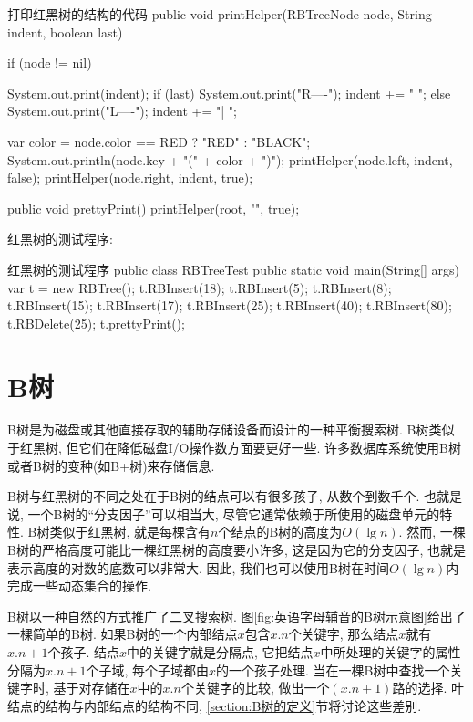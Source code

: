 \documentclass[oneside,10pt,fontset=none]{ctexbook}
\numberwithin{definition}{chapter}
\numberwithin{theorem}{chapter}
\numberwithin{lemma}{chapter}
\begin{document}
\begin{myjava}{}{打印红黑树的结构的代码}{}
public void printHelper(RBTreeNode node, String indent, boolean last) {
    if (node != nil) {
        System.out.print(indent);
        if (last) {
            System.out.print("R----");
            indent += "    ";
        } else {
            System.out.print("L----");
            indent += "|    ";
        }

        var color = node.color == RED ? "RED" : "BLACK";
        System.out.println(node.key + "(" + color + ")");
        printHelper(node.left, indent, false);
        printHelper(node.right, indent, true);
    }
}

public void prettyPrint() {
    printHelper(root, "", true);
}
\end{myjava}

红黑树的测试程序:

\begin{myjava}{}{红黑树的测试程序}{}
public class RBTreeTest {
    public static void main(String[] args) {
        var t = new RBTree();
        t.RBInsert(18);
        t.RBInsert(5);
        t.RBInsert(8);
        t.RBInsert(15);
        t.RBInsert(17);
        t.RBInsert(25);
        t.RBInsert(40);
        t.RBInsert(80);
        t.RBDelete(25);
        t.prettyPrint();
    }
}
\end{myjava}

\chapter{B树}

B树是为磁盘或其他直接存取的辅助存储设备而设计的一种平衡搜索树. B树类似于红黑树, 但它们在降低磁盘I/O操作数方面要更好一些. 许多数据库系统使用B树或者B树的变种(如B+树)来存储信息.

B树与红黑树的不同之处在于B树的结点可以有很多孩子, 从数个到数千个. 也就是说, 一个B树的``分支因子''可以相当大, 尽管它通常依赖于所使用的磁盘单元的特性. B树类似于红黑树, 就是每棵含有$n$个结点的B树的高度为$O(\lg{n})$. 然而, 一棵B树的严格高度可能比一棵红黑树的高度要小许多, 这是因为它的分支因子, 也就是表示高度的对数的底数可以非常大. 因此, 我们也可以使用B树在时间$O(\lg{n})$内完成一些动态集合的操作.

B树以一种自然的方式推广了二叉搜索树. 图\ref{fig:英语字母辅音的B树示意图}给出了一棵简单的B树. 如果B树的一个内部结点$x$包含$x.n$个关键字, 那么结点$x$就有$x.n+1$个孩子. 结点$x$中的关键字就是分隔点, 它把结点$x$中所处理的关键字的属性分隔为$x.n+1$个子域, 每个子域都由$x$的一个孩子处理. 当在一棵B树中查找一个关键字时, 基于对存储在$x$中的$x.n$个关键字的比较, 做出一个$(x.n+1)$路的选择. 叶结点的结构与内部结点的结构不同, \ref{section:B树的定义}节将讨论这些差别.
\end{document}
